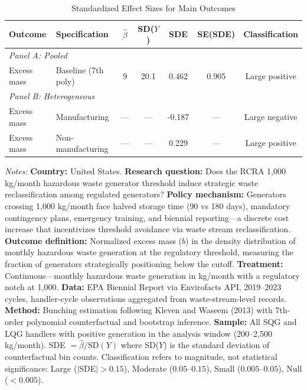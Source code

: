 
\begin{table}[H]
\centering
\caption{Standardized Effect Sizes for Main Outcomes}
\label{tab:sde}
\begin{threeparttable}
\begin{tabular}{llccccc}
\toprule
Outcome & Specification & $\hat{\beta}$ & SD($Y$) & SDE & SE(SDE) & Classification \\
\midrule
\multicolumn{7}{l}{\textit{Panel A: Pooled}} \\
Excess mass & Baseline (7th poly) & 9 & 20.1 & 0.462 & 0.905 & Large positive \\
\midrule
\multicolumn{7}{l}{\textit{Panel B: Heterogeneous}} \\
Excess mass & Manufacturing & --- & --- & -0.187 & --- & Large negative \\
Excess mass & Non-manufacturing & --- & --- & 0.229 & --- & Large positive \\
\bottomrule
\end{tabular}
\begin{tablenotes}[flushleft]
\footnotesize
\item \textit{Notes:} \textbf{Country:} United States. \textbf{Research question:} Does the RCRA 1,000 kg/month hazardous waste generator threshold induce strategic waste reclassification among regulated generators? \textbf{Policy mechanism:} Generators crossing 1,000 kg/month face halved storage time (90 vs 180 days), mandatory contingency plans, emergency training, and biennial reporting---a discrete cost increase that incentivizes threshold avoidance via waste stream reclassification. \textbf{Outcome definition:} Normalized excess mass ($b$) in the density distribution of monthly hazardous waste generation at the regulatory threshold, measuring the fraction of generators strategically positioning below the cutoff. \textbf{Treatment:} Continuous---monthly hazardous waste generation in kg/month with a regulatory notch at 1,000. \textbf{Data:} EPA Biennial Report via Envirofacts API, 2019--2023 cycles, handler-cycle observations aggregated from waste-stream-level records. \textbf{Method:} Bunching estimation following Kleven and Waseem (2013) with 7th-order polynomial counterfactual and bootstrap inference. \textbf{Sample:} All SQG and LQG handlers with positive generation in the analysis window (200--2,500 kg/month). SDE $= \hat{\beta} / \text{SD}(Y)$ where SD($Y$) is the standard deviation of counterfactual bin counts. Classification refers to magnitude, not statistical significance: Large ($|$SDE$| > 0.15$), Moderate ($0.05$--$0.15$), Small ($0.005$--$0.05$), Null ($< 0.005$).
\end{tablenotes}
\end{threeparttable}
\end{table}
